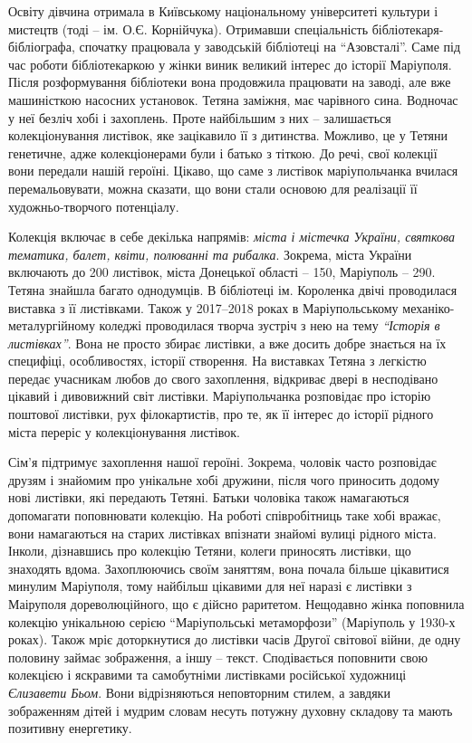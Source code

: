 
Освіту дівчина отримала в Київському національному університеті культури і
мистецтв (тоді – ім. О.Є. Корнійчука). Отримавши спеціальність
бібліотекаря-бібліографа, спочатку працювала у заводській бібліотеці на
\enquote{Азовсталі}. Саме під час роботи бібліотекаркою у жінки виник великий
інтерес до історії Маріуполя. Після розформування бібліотеки вона продовжила
працювати на заводі, але вже машиністкою насосних установок. Тетяна заміжня,
має чарівного сина. Водночас у неї безліч хобі і захоплень. Проте найбільшим з
них – залишається колекціонування листівок, яке зацікавило її з дитинства.
Можливо, це у Тетяни генетичне, адже колекціонерами були і батько з тіткою. До
речі, свої колекції вони передали нашій героїні. Цікаво, що саме з листівок
маріупольчанка вчилася перемальовувати, можна сказати, що вони стали основою
для реалізації її художньо-творчого потенціалу.

Колекція включає в себе декілька напрямів: \emph{міста і містечка України, святкова
тематика, балет, квіти, полюванні та рибалка}. Зокрема, міста України включають
до 200 листівок, міста Донецької області – 150, Маріуполь – 290. Тетяна знайшла
багато однодумців. В бібліотеці ім. Короленка двічі проводилася виставка з її
листівками. Також у 2017–2018 роках в Маріупольському механіко-металургійному
коледжі проводилася творча зустріч з нею на тему \emph{\enquote{Історія в листівках}}. Вона не
просто збирає листівки, а вже досить добре знається на їх специфіці,
особливостях, історії створення. На виставках Тетяна з легкістю передає
учасникам любов до свого захоплення, відкриває двері в несподівано цікавий і
дивовижний світ листівки. Маріупольчанка розповідає про історію поштової
листівки, рух філокартистів, про те, як її інтерес до історії рідного міста
переріс у колекціонування листівок. 


Сім'я підтримує захоплення нашої героїні. Зокрема, чоловік часто розповідає
друзям і знайомим про унікальне хобі дружини, після чого приносить додому нові
листівки, які передають Тетяні. Батьки чоловіка також намагаються допомагати
поповнювати колекцію. На роботі співробітниць таке хобі вражає, вони
намагаються на старих листівках впізнати знайомі вулиці рідного міста. Інколи,
дізнавшись про колекцію Тетяни, колеги приносять листівки, що знаходять вдома.
Захоплюючись своїм заняттям, вона почала більше цікавитися минулим Маріуполя,
тому найбільш цікавими для неї наразі є листівки з Маіруполя дореволюційного,
що є дійсно раритетом. Нещодавно жінка поповнила колекцію унікальною серією
\enquote{Маріупольські метаморфози} (Маріуполь у 1930-х роках). Також мріє доторкнутися
до листівки часів Другої світової війни, де одну половину займає зображення, а
іншу – текст. Сподівається поповнити свою колекцією і яскравими та самобутніми
листівками російської художниці \emph{Єлизавети Бьом}. Вони відрізняються неповторним
стилем, а завдяки зображенням дітей і мудрим словам несуть потужну духовну
складову та мають позитивну енергетику.


